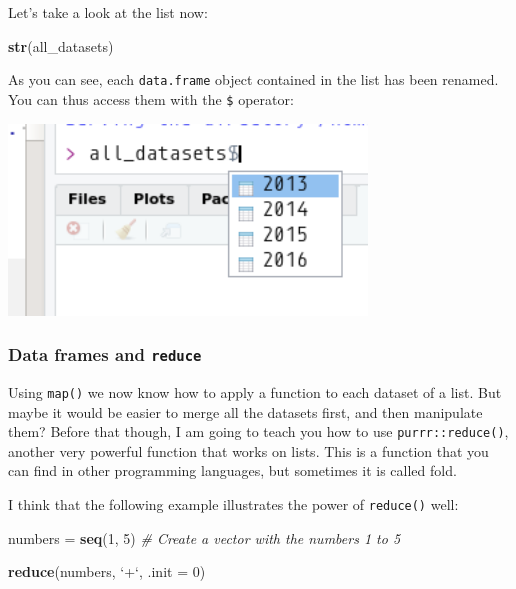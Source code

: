 \documentclass[]{gitbook}
\newenvironment{Shaded}{\begin{snugshade}}{\end{snugshade}}
\newcommand{\CommentTok}[1]{\textcolor[rgb]{0.56,0.35,0.01}{\textit{#1}}}
\newcommand{\DataTypeTok}[1]{\textcolor[rgb]{0.13,0.29,0.53}{#1}}
\newcommand{\DecValTok}[1]{\textcolor[rgb]{0.00,0.00,0.81}{#1}}
\newcommand{\KeywordTok}[1]{\textcolor[rgb]{0.13,0.29,0.53}{\textbf{#1}}}
\newcommand{\NormalTok}[1]{#1}
\newcommand{\StringTok}[1]{\textcolor[rgb]{0.31,0.60,0.02}{#1}}
\theoremstyle{definition}
\theoremstyle{definition}
\theoremstyle{definition}
\theoremstyle{remark}
\begin{document}
Let's take a look at the list now:

\begin{Shaded}
\begin{Highlighting}[]
\KeywordTok{str}\NormalTok{(all_datasets)}
\end{Highlighting}
\end{Shaded}

As you can see, each \texttt{data.frame} object contained in the list
has been renamed. You can thus access them with the \texttt{\$}
operator:

\includegraphics[width=3.75in]{pics/all_datasets_names}

\hypertarget{data-frames-and-reduce}{%
\subsubsection{\texorpdfstring{Data frames and
\texttt{reduce}}{Data frames and reduce}}\label{data-frames-and-reduce}}

Using \texttt{map()} we now know how to apply a function to each dataset
of a list. But maybe it would be easier to merge all the datasets first,
and then manipulate them? Before that though, I am going to teach you
how to use \texttt{purrr::reduce()}, another very powerful function that
works on lists. This is a function that you can find in other
programming languages, but sometimes it is called fold.

I think that the following example illustrates the power of
\texttt{reduce()} well:

\begin{Shaded}
\begin{Highlighting}[]
\NormalTok{numbers =}\StringTok{ }\KeywordTok{seq}\NormalTok{(}\DecValTok{1}\NormalTok{, }\DecValTok{5}\NormalTok{) }\CommentTok{# Create a vector with the numbers 1 to 5}

\KeywordTok{reduce}\NormalTok{(numbers, }\StringTok{`}\DataTypeTok{+}\StringTok{`}\NormalTok{, }\DataTypeTok{.init =} \DecValTok{0}\NormalTok{)}
\end{Highlighting}
\end{Shaded}
\end{document}
